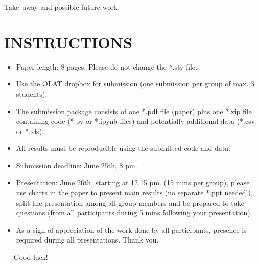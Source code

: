 \documentclass[conference]{IEEEtran}
\begin{document}
Take--away and possible future work. 
\vspace{10ex}

\section*{INSTRUCTIONS}
\vspace{1ex}
\begin{itemize}
	\item Paper length: 8 pages. Please do not change the *.sty file.
	\item Use the OLAT dropbox for submission (one submission per group of max. 3 students).
	\item The submission package consists of one *.pdf file (paper) plus one *.zip file containing code (*.py or *.ipynb files) and potentially additional data (*.csv or *.xls).
	\item All results must be reproducible using the submitted code and data. 
	\item Submission deadline: June 25th, 8 pm.
	\item Presentation: June 26th, starting at 12.15 pm. (15 mins per group), please use charts in the paper to present main results (no separate *.ppt needed!), split the presentation among all group members and be prepared to take questions (from all participants during 5 mins following your presentation). 
	\item As a sign of appreciation of the work done by all participants, presence is required during all presentations. Thank you.

\end{itemize}
\vspace{2ex}
$\quad$ Good luck!

\vspace{5ex}




\end{document}
